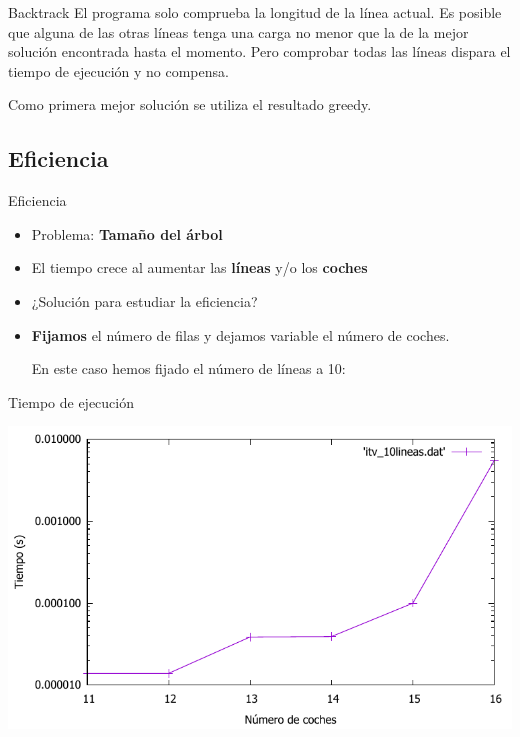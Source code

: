 \begin{frame}{Backtrack}
	El programa solo comprueba la longitud de la línea actual. Es posible que alguna de las otras líneas tenga una carga no menor que la de la mejor solución encontrada hasta el momento. Pero comprobar todas las líneas dispara el tiempo de ejecución y no compensa.

	\pause

	Como primera mejor solución se utiliza el resultado greedy.
\end{frame}

\subsection{Eficiencia}

\begin{frame}{Eficiencia}
	\begin{itemize}
		\item Problema: \textbf{Tamaño del árbol}
		\pause
		\item El tiempo crece al aumentar las \textbf{líneas} y/o los \textbf{coches}
		\pause
		\item ¿Solución para estudiar la eficiencia?
		\pause
		\item \textbf{Fijamos} el número de filas y dejamos variable el número de coches.

		En este caso hemos fijado el número de líneas a 10:
	\end{itemize}
\end{frame}

\begin{frame}{Tiempo de ejecución}
	\begin{center}
		\includegraphics[width = \linewidth]{img/itvEficiencia}
	\end{center}
\end{frame}

